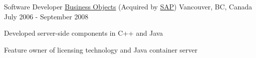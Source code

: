 \begin{cventries}
  \cventry
    {Software Developer} %
    {\href{http://www.businessobjects.com}{Business Objects} (Acquired by \href{https://www.sap.com}{SAP})} %
    {Vancouver, BC, Canada} %
    {July 2006 - September 2008} %
    {
      \begin{cvitems} %
        \item {Developed server-side components in C++ and Java}
        \item {Feature owner of licensing technology and Java container server}
      \end{cvitems}
    }

\end{cventries}
